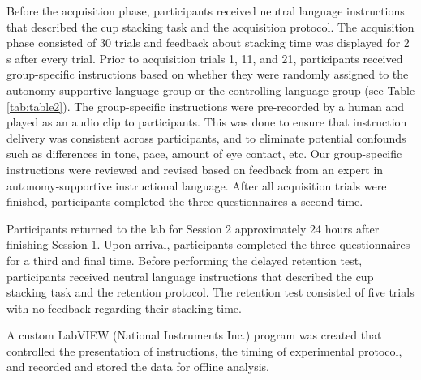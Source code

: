 \documentclass[doc,floatsintext,donotrepeattitle,letterpaper,12pt]{apa7}
\begin{document}
Before the acquisition phase, participants received neutral language instructions that described the cup stacking task and the acquisition protocol. The acquisition phase consisted of 30 trials and feedback about stacking time was displayed for 2 s after every trial. Prior to acquisition trials 1, 11, and 21, participants received group-specific instructions based on whether they were randomly assigned to the autonomy-supportive language group or the controlling language group (see Table \ref{tab:table2}). The group-specific instructions were pre-recorded by a human and played as an audio clip to participants. This was done to ensure that instruction delivery was consistent across participants, and to eliminate potential confounds such as differences in tone, pace, amount of eye contact, etc. Our group-specific instructions were reviewed and revised based on feedback from an expert in autonomy-supportive instructional language.\footnotemark{} After all acquisition trials were finished, participants completed the three questionnaires a second time.

Participants returned to the lab for Session 2 approximately 24 hours after finishing Session 1. Upon arrival, participants completed the three questionnaires for a third and final time. Before performing the delayed retention test, participants received neutral language instructions that described the cup stacking task and the retention protocol. The retention test consisted of five trials with no feedback regarding their stacking time.

A custom LabVIEW (National Instruments Inc.) program was created that controlled the presentation of instructions, the timing of experimental protocol, and recorded and stored the data for offline analysis.
\end{document}
